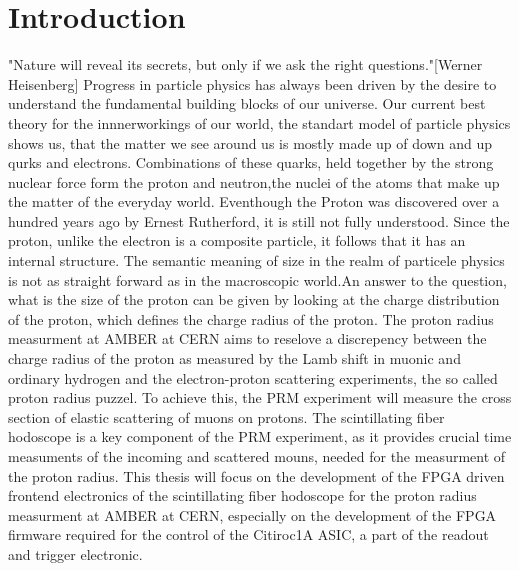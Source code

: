 \chapter{Introduction}
\label{chap:introduction}
"Nature will reveal its secrets, but only if we ask the right questions."[Werner Heisenberg]
\newline
Progress in particle physics has always been driven by the desire to understand the fundamental building blocks of our universe.
\newline Our current best theory for the innnerworkings of our world,
the standart model of particle physics shows us, that the matter we see around us is mostly made up of down and up qurks and electrons.
Combinations of these quarks, held together by the strong nuclear force form the proton and neutron,the nuclei of the atoms that make up the matter of the everyday world.
Eventhough the Proton was discovered over a hundred years ago by Ernest Rutherford\autocite{discoveryProton}, it is still not fully understood.
\newline
Since the proton, unlike the electron is a composite particle, it follows that it has an internal structure.
The semantic meaning of size in the realm of particele physics is not as straight forward as in the macroscopic world.An answer to the question,
what is the size of the proton can be given 
by looking at the charge distribution of the proton, which defines the charge radius of the proton.
\newline
The proton radius measurment at AMBER at CERN aims to reselove a discrepency between the charge radius of the proton as measured by the Lamb shift in muonic and ordinary hydrogen and the electron-proton scattering experiments,
the so called proton radius puzzel.
\newline
To achieve this, the PRM experiment will measure the cross section of elastic scattering of muons on protons.
The scintillating fiber hodoscope is a key component of the PRM experiment, as it provides crucial time measuments of the incoming and scattered mouns, needed for the measurment of the proton radius\Autocite{ProposalAmber}.
\newline
This thesis will focus on the development of the FPGA driven frontend electronics of the scintillating fiber hodoscope 
for the proton radius measurment at AMBER at CERN,
especially on the development of the FPGA firmware required for the control of the Citiroc1A ASIC, a part of the readout and trigger electronic. 
\newline
 
